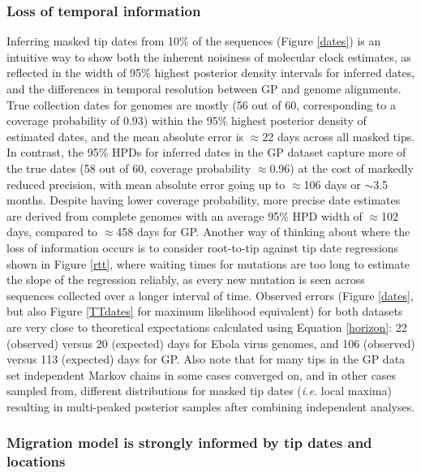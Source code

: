 \documentclass{bmcart}
\begin{document}
\subsubsection*{Loss of temporal information}


Inferring masked tip dates from 10\% of the sequences (Figure \ref{dates}) is an intuitive way to show both the inherent noisiness of molecular clock estimates, as reflected in the width of 95\% highest posterior density intervals for inferred dates, and the differences in temporal resolution between GP and genome alignments.
True collection dates for genomes are mostly (56 out of 60, corresponding to a coverage probability of 0.93) within the 95\% highest posterior density of estimated dates, and the mean absolute error is $\approx$22 days across all masked tips.
In contrast, the 95\% HPDs for inferred dates in the GP dataset capture more of the true dates (58 out of 60, coverage probability $\approx$0.96) at the cost of markedly reduced precision, with mean absolute error going up to $\approx$106 days or $\sim$3.5 months.
Despite having lower coverage probability, more precise date estimates are derived from complete genomes with an average 95\% HPD width of $\approx$102 days, compared to $\approx$458 days for GP.
Another way of thinking about where the loss of information occurs is to consider root-to-tip against tip date regressions shown in Figure \ref{rtt}, where waiting times for mutations are too long to estimate the slope of the regression reliably, as every new mutation is seen across sequences collected over a longer interval of time.
Observed errors (Figure \ref{dates}, but also Figure \ref{TTdates} for maximum likelihood equivalent) for both datasets are very close to theoretical expectations calculated using Equation \ref{horizon}: 22 (observed) versus 20 (expected) days for Ebola virus genomes, and 106 (observed) versus 113 (expected) days for GP.
Also note that for many tips in the GP data set independent Markov chains in some cases converged on, and in other cases sampled from, different distributions for masked tip dates (\textit{i.e.} local maxima) resulting in multi-peaked posterior samples after combining independent analyses.




\subsubsection*{Migration model is strongly informed by tip dates and locations}
\end{document}
